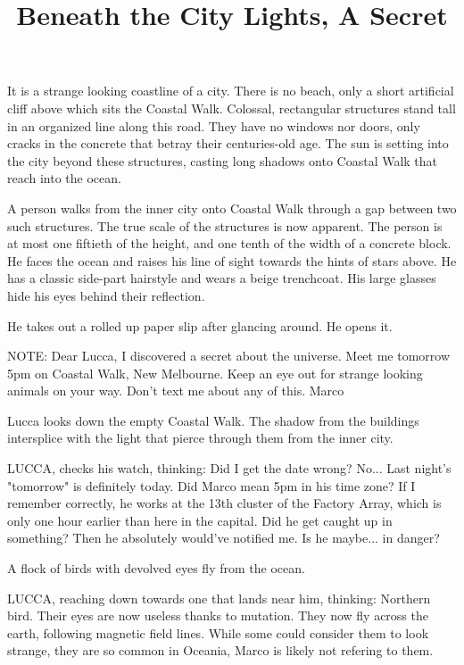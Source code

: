 \documentclass[11pt]{article}
\begin{document}
\ttfamily
\title{Beneath the City Lights, A Secret}
\maketitle
It is a strange looking coastline of a city. 
There is no beach, only a short artificial cliff above which sits the Coastal Walk.
Colossal, rectangular structures stand tall in an organized line along this road.
They have no windows nor doors, only cracks in the concrete that betray their centuries-old age. 
The sun is setting into the city beyond these structures, casting long shadows onto Coastal Walk that reach into the ocean.

A person walks from the inner city onto Coastal Walk through a gap between two such structures.
The true scale of the structures is now apparent. 
The person is at most one fiftieth of the height, and one tenth of the width of a concrete block.
He faces the ocean and raises his line of sight towards the hints of stars above. 
He has a classic side-part hairstyle and wears a beige trenchcoat. 
His large glasses hide his eyes behind their reflection. 

He takes out a rolled up paper slip after glancing around. 
He opens it. 

NOTE: 
Dear Lucca, I discovered a secret about the universe. 
Meet me tomorrow 5pm on Coastal Walk, New Melbourne. 
Keep an eye out for strange looking animals on your way. 
Don't text me about any of this. 
Marco

Lucca looks down the empty Coastal Walk. 
The shadow from the buildings intersplice with the light that pierce through them from the inner city. 

LUCCA, checks his watch, thinking: 
Did I get the date wrong? No... Last night's "tomorrow" is definitely today. 
Did Marco mean 5pm in his time zone? 
If I remember correctly, he works at the 13th cluster of the Factory Array, which is only one hour earlier than here in the capital. 
Did he get caught up in something? 
Then he absolutely would've notified me. 
Is he maybe... in danger?

A flock of birds with devolved eyes fly from the ocean. 

LUCCA, reaching down towards one that lands near him, thinking: 
Northern bird. Their eyes are now useless thanks to mutation. 
They now fly across the earth, following magnetic field lines. 
While some could consider them to look strange, they are so common in Oceania, Marco is likely not refering to them.
\end{document}
